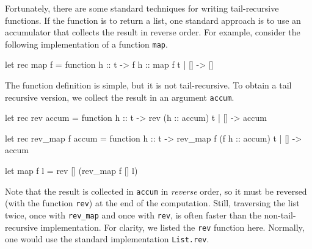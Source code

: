 Fortunately, there are some standard techniques for writing
tail-recursive functions.  If the function is to return a list, one
standard approach is to use an accumulator that collects the result in
reverse order.  For example, consider the following implementation of
a function \hbox{\lstinline/map/}.

\begin{ocaml}
let rec map f = function
   h :: t -> f h :: map f t
 | [] -> []
\end{ocaml}
%
The function definition is simple, but it is not tail-recursive.  To
obtain a tail recursive version, we collect the result in an argument
\hbox{\lstinline/accum/}.

\begin{ocaml}
let rec rev accum = function
   h :: t -> rev (h :: accum) t
 | [] -> accum

let rec rev_map f accum = function
   h :: t -> rev_map f (f h :: accum) t
 | [] -> accum

let map f l = rev [] (rev_map f [] l)
\end{ocaml}
%
Note that the result is collected in \hbox{\lstinline/accum/}
in \emph{reverse} order, so it must be reversed (with the
function \hbox{\lstinline/rev/}) at the end of the computation.  Still,
traversing the list twice, once with \hbox{\lstinline/rev_map/} and once
with \hbox{\lstinline/rev/}, is often faster than the non-tail-recursive
implementation.  For clarity, we listed the \hbox{\lstinline/rev/} function
here.  Normally, one would use the standard
implementation \hbox{\lstinline/List.rev/}.
